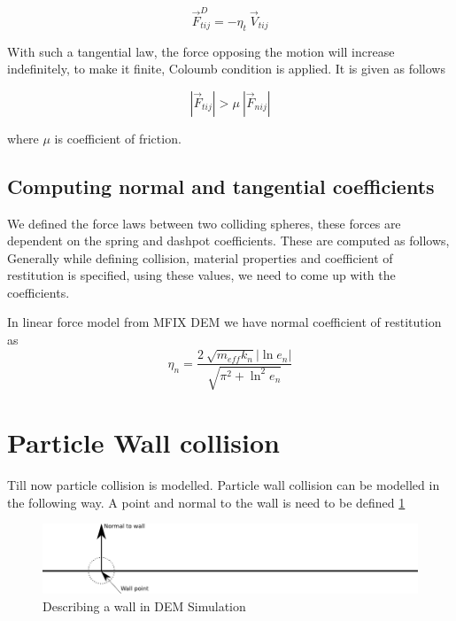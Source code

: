 \begin{equation}
  \label{eq:tang_damp_force}
  \vec{F}_{tij}^D = -\eta_t \> \vec{V}_{tij}
\end{equation}

With such a tangential law, the force opposing the motion will increase indefinitely,
to make it finite, Coloumb condition is applied. It is given as follows

\begin{equation}
  \label{eq:coloumb}
  |\vec{F}_{tij}| > \mu \> |\vec{F}_{nij}|
\end{equation}

where $\mu$ is coefficient of friction.

\subsection{Computing normal and tangential coefficients}

We defined the force laws between two colliding spheres, these forces are
dependent on the spring and dashpot coefficients. These are computed as follows,
Generally while defining collision, material properties and coefficient of restitution is
specified, using these values, we need to come up with the coefficients.

In linear force model from MFIX DEM we have normal coefficient of restitution as
\begin{equation}
  \label{eq:damping_coefficient}
  \eta_{n} = \frac{2 \> \sqrt{m_{eff}k_{n}}|\ln e_n|}{\sqrt{\pi^2 + \ln^2e_{n}}}
\end{equation}


\section{Particle Wall collision}
\label{sec:PWColl}

Till now particle  collision is modelled. Particle wall
collision can be modelled in the following way. A point and normal to
the wall is need to be defined \ref{fig:wall_description}

\begin{figure}
  \centering
  \includegraphics[scale=2.]{dem/wall_description}
  \caption{Describing a wall in DEM Simulation}
  \label{fig:wall_description}
\end{figure}


